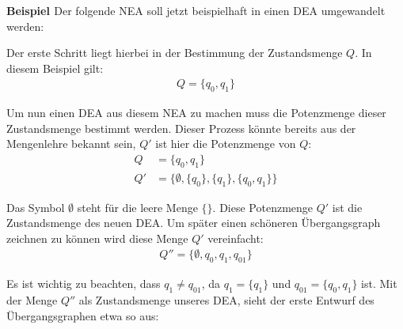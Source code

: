 \begin{flushleft}
\textbf{Beispiel \cite{potenzmengenkonstruktion}}
Der folgende NEA soll jetzt beispielhaft in einen DEA umgewandelt werden:
\end{flushleft}
    
\begin{center}
\end{center}

\begin{flushleft}
Der erste Schritt liegt hierbei in der Bestimmung der Zustandsmenge $Q$.
In diesem Beispiel gilt:
\begin{align}
    Q=\{q_0,q_1\}
\end{align}

Um nun einen DEA aus diesem NEA zu machen muss die Potenzmenge
dieser Zustandsmenge bestimmt werden. Dieser Prozess könnte
bereits aus der Mengenlehre bekannt sein, $Q'$ ist hier die
Potenzmenge von $Q$:
\begin{align}
    Q &=\{q_0,q_1\} \\
    Q' &=\{\emptyset,\{q_0\},\{q_1\},\{q_0,q_1\}\}
\end{align}

Das Symbol $\emptyset$ steht für die leere Menge $\{\}$.
Diese Potenzmenge $Q'$ ist die Zustandsmenge des neuen DEA.
Um später einen schöneren Übergangsgraph zeichnen zu können
wird diese Menge $Q'$ vereinfacht:
\begin{align}
    Q'' =\{\emptyset,q_0,q_1,q_{01}\}
\end{align}

Es ist wichtig zu beachten, dass $q_1 \neq q_{01}$,
da $q_1=\{q_1\}$ und $q_{01}=\{q_0,q_1\}$ ist.
Mit der Menge $Q''$ als Zustandsmenge unseres DEA,
sieht der erste Entwurf des Übergangsgraphen etwa so aus:
\end{flushleft}
    
\begin{center}
\end{center}

